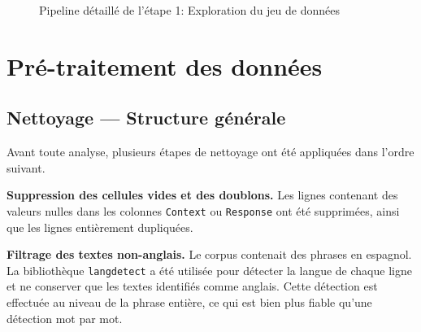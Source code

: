 \documentclass[12pt,a4paper]{report}
\begin{document}
\begin{figure}[H]
\begin{center}
%
\label{fig:flowchart-etape1}
\caption{Pipeline détaillé de l'étape 1: Exploration du jeu de données}
\end{center}
\end{figure}

\pagebreak

\chapter{Pré-traitement des données}

\section{Nettoyage — Structure générale}

Avant toute analyse, plusieurs étapes de nettoyage ont été appliquées dans l'ordre suivant.

\textbf{Suppression des cellules vides et des doublons.}
Les lignes contenant des valeurs nulles dans les colonnes \texttt{Context} ou \texttt{Response}
ont été supprimées, ainsi que les lignes entièrement dupliquées.

\textbf{Filtrage des textes non-anglais.}
Le corpus contenait des phrases en espagnol. La bibliothèque \texttt{langdetect} a été utilisée
pour détecter la langue de chaque ligne et ne conserver que les textes identifiés comme anglais.
Cette détection est effectuée au niveau de la phrase entière, ce qui est bien plus fiable qu'une
détection mot par mot.
\end{document}
